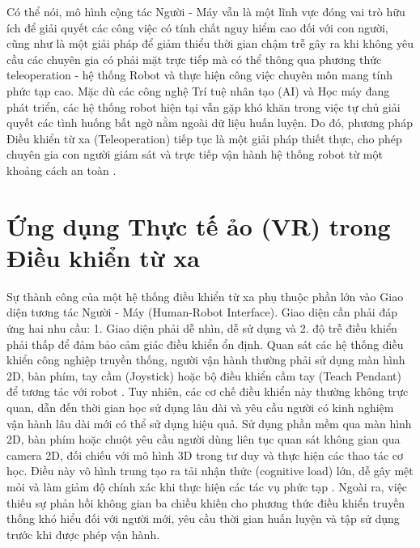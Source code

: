 Có thể nói, mô hình cộng tác Người - Máy vẫn là một lĩnh vực đóng vai trò hữu ích để giải quyết các công việc có tính chất nguy hiểm cao đối với con người, cũng như là một giải pháp để giảm thiểu thời gian chậm trễ gây ra khi không yêu cầu các chuyên gia có phải mặt trực tiếp mà có thể thông qua phương thức teleoperation - hệ thống Robot và thực hiện công việc chuyên môn mang tính phức tạp cao. Mặc dù các công nghệ Trí tuệ nhân tạo (AI) và Học máy đang phát triển, các hệ thống robot hiện tại vẫn gặp khó khăn trong việc tự chủ giải quyết các tình huống bất ngờ nằm ngoài dữ liệu huấn luyện. Do đó, phương pháp Điều khiển từ xa (Teleoperation) tiếp tục là một giải pháp thiết thực, cho phép chuyên gia con người giám sát và trực tiếp vận hành hệ thống robot từ một khoảng cách an toàn \cite{darvish2023teleoperation}.

\section{Ứng dụng Thực tế ảo (VR) trong Điều khiển từ xa}
Sự thành công của một hệ thống điều khiển từ xa phụ thuộc phần lớn vào Giao diện tương tác Người - Máy (Human-Robot Interface). Giao diện cần phải đáp ứng hai nhu cầu: 1. Giao diện phải dễ nhìn, dễ sử dụng và 2. độ trễ điều khiển phải thấp để đảm bảo cảm giác điều khiển ổn định. Quan sát các hệ thống điều khiển công nghiệp truyền thống, người vận hành thường phải sử dụng màn hình 2D, bàn phím, tay cầm (Joystick) hoặc bộ điều khiển cầm tay (Teach Pendant) để tương tác với robot \cite{hetrick2020comparing}. Tuy nhiên, các cơ chế điều khiển này thường không trực quan, dẫn đến thời gian học sử dụng lâu dài và yêu cầu người có kinh nghiệm vận hành lâu dài mới có thể sử dụng hiệu quả. Sử dụng phần mềm qua màn hình 2D, bàn phím hoặc chuột yêu cầu người dùng liên tục quan sát không gian qua camera 2D, đối chiếu với mô hình 3D trong tư duy và thực hiện các thao tác cơ học. Điều này vô hình trung tạo ra tải nhận thức (cognitive load) lớn, dễ gây mệt mỏi và làm giảm độ chính xác khi thực hiện các tác vụ phức tạp \cite{chen2023comparing}. Ngoài ra, việc thiếu sự phản hồi không gian ba chiều khiến cho phương thức điều khiển truyền thống khó hiểu đối với người mới, yêu cầu thời gian huấn luyện và tập sử dụng trước khi được phép vận hành.

